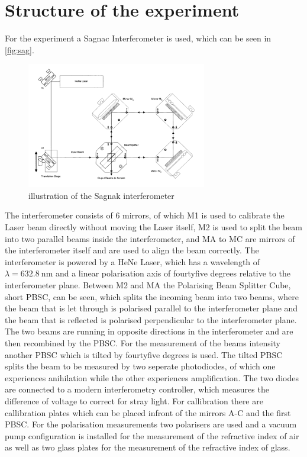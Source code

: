 \section{Structure of the experiment}
\label{sec:struc}
For the experiment a Sagnac Interferometer is used, which can be seen in \autoref{fig:sag}.
\begin{figure}[H]
    \centering
    \includegraphics[width=0.7\textwidth]{sagnak.pdf}
    \caption{illustration of the Sagnak interferometer \cite{sample}}
    \label{fig:sag}
\end{figure}
\noindent
The interferometer consists of 6 mirrors, of which M1 is used to calibrate the Laser beam directly without moving the Laser itself, M2 is used to split the beam into two parallel beams inside the interferometer, and MA to MC are mirrors of the interferometer itself and are used to align the beam correctly.
The interferometer is powered by a HeNe Laser, which has a wavelength of $\lambda = \SI{632.8}{\nano\meter}$ and a linear polarisation axis of fourtyfive degrees relative to the interferometer plane. Between M2 and MA the Polarising Beam Splitter Cube, short PBSC, can be seen, which splits the incoming beam into two beams, where the beam that is let through is polarised parallel to the interferometer plane and the beam that is reflected is polarised perpendicular to the interferometer plane. The two beams are running in opposite directions in the interferometer and are then recombined by the PBSC.
For the measurement of the beams intensity another PBSC which is tilted by fourtyfive degrees is used. The tilted PBSC splits the beam to be measured by two seperate photodiodes, of which one experiences anihilation while the other experiences amplification. The two diodes are connected to a modern interferometry controller, which measures the difference of voltage to correct for stray light. For callibration there are callibration plates which can be placed infront of the mirrors A-C and the first PBSC. For the polarisation measurements two polarisers are used and a vacuum pump configuration is installed for the measurement of the refractive index of air as well as two glass plates for the measurement of the refractive index of glass. 


